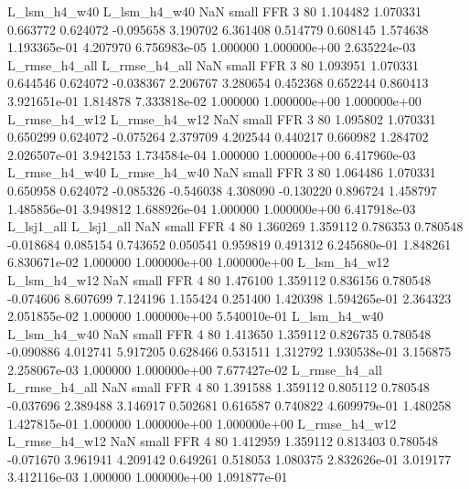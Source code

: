  L_lsm_h4_w40  L_lsm_h4_w40                   NaN      small      FFR                 3 80 1.104482       1.070331 0.663772       0.624072   -0.095658      3.190702      6.361408     0.514779       0.608145  1.574638 1.193365e-01     4.207970   6.756983e-05            1.000000    1.000000e+00        2.635224e-03
L_rmse_h4_all L_rmse_h4_all                   NaN      small      FFR                 3 80 1.093951       1.070331 0.644546       0.624072   -0.038367      2.206767      3.280654     0.452368       0.652244  0.860413 3.921651e-01     1.814878   7.333818e-02            1.000000    1.000000e+00        1.000000e+00
L_rmse_h4_w12 L_rmse_h4_w12                   NaN      small      FFR                 3 80 1.095802       1.070331 0.650299       0.624072   -0.075264      2.379709      4.202544     0.440217       0.660982  1.284702 2.026507e-01     3.942153   1.734584e-04            1.000000    1.000000e+00        6.417960e-03
L_rmse_h4_w40 L_rmse_h4_w40                   NaN      small      FFR                 3 80 1.064486       1.070331 0.650958       0.624072   -0.085326     -0.546038      4.308090    -0.130220       0.896724  1.458797 1.485856e-01     3.949812   1.688926e-04            1.000000    1.000000e+00        6.417918e-03
   L_lsj1_all    L_lsj1_all                   NaN      small      FFR                 4 80 1.360269       1.359112 0.786353       0.780548   -0.018684      0.085154      0.743652     0.050541       0.959819  0.491312 6.245680e-01     1.848261   6.830671e-02            1.000000    1.000000e+00        1.000000e+00
 L_lsm_h4_w12  L_lsm_h4_w12                   NaN      small      FFR                 4 80 1.476100       1.359112 0.836156       0.780548   -0.074606      8.607699      7.124196     1.155424       0.251400  1.420398 1.594265e-01     2.364323   2.051855e-02            1.000000    1.000000e+00        5.540010e-01
 L_lsm_h4_w40  L_lsm_h4_w40                   NaN      small      FFR                 4 80 1.413650       1.359112 0.826735       0.780548   -0.090886      4.012741      5.917205     0.628466       0.531511  1.312792 1.930538e-01     3.156875   2.258067e-03            1.000000    1.000000e+00        7.677427e-02
L_rmse_h4_all L_rmse_h4_all                   NaN      small      FFR                 4 80 1.391588       1.359112 0.805112       0.780548   -0.037696      2.389488      3.146917     0.502681       0.616587  0.740822 4.609979e-01     1.480258   1.427815e-01            1.000000    1.000000e+00        1.000000e+00
L_rmse_h4_w12 L_rmse_h4_w12                   NaN      small      FFR                 4 80 1.412959       1.359112 0.813403       0.780548   -0.071670      3.961941      4.209142     0.649261       0.518053  1.080375 2.832626e-01     3.019177   3.412116e-03            1.000000    1.000000e+00        1.091877e-01
